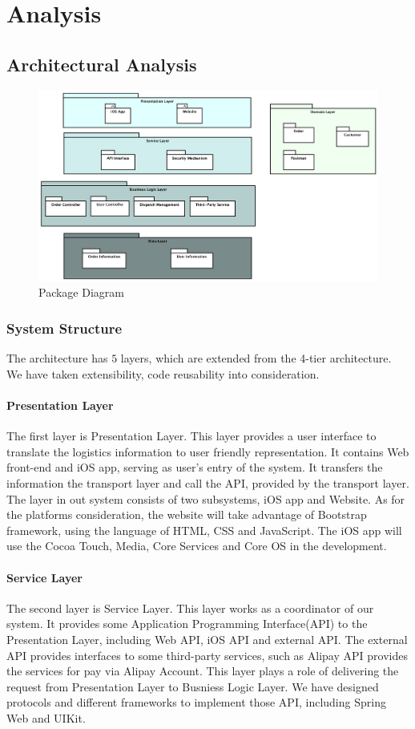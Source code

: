 \documentclass[12pt]{scrreprt}
\begin{document}
\chapter{Analysis}
\section{Architectural Analysis}
\begin{figure}[H]
  \centering\includegraphics[width=6in]{DocumentRes/PackageDiagram.png}
  \caption{Package Diagram}
\end{figure}
\subsection{System Structure}
The architecture has $5$ layers, which are extended from the 4-tier architecture.
We have taken extensibility, code reusability into consideration.
\subsubsection{Presentation Layer}
The first layer is Presentation Layer. This layer provides a user interface to
translate the logistics information to user friendly representation. It contains
Web front-end and iOS app, serving as user's entry of the system. It transfers
the information the transport layer and call the API, provided by the transport
layer. The layer in out system consists of two subsystems, iOS app and Website.
As for the platforms consideration, the website will take advantage of Bootstrap
framework, using the language of HTML, CSS and JavaScript. The iOS app will use
the Cocoa Touch, Media, Core Services and Core OS in the development.
\subsubsection{Service Layer}
The second layer is Service Layer. This layer works as a coordinator of our
system. It provides some Application Programming Interface(API) to the
Presentation Layer, including Web API, iOS API and external API. The external
API provides interfaces to some third-party services, such as Alipay API
provides the services for pay via Alipay Account. This layer plays a role
of delivering the request from Presentation Layer to Busniess Logic Layer.
We have designed protocols and different frameworks to implement those API,
including Spring Web and UIKit.
\end{document}
